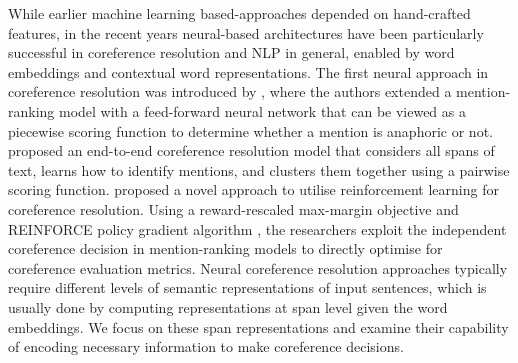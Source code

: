 \documentclass[11pt]{article}
\begin{document}
While earlier machine learning based-approaches depended on hand-crafted features, in the recent years neural-based architectures have been particularly successful in coreference resolution and NLP in general, enabled by word embeddings and contextual word representations. The first neural approach in coreference resolution was introduced by \textcite{wiseman2015learning}, where the authors extended a mention-ranking model with a feed-forward neural network that can be viewed as a piecewise scoring function to determine whether a mention is anaphoric or not. \textcite{lee2017end} proposed an end-to-end coreference resolution model that considers all spans of text, learns how to identify mentions, and clusters them together using a pairwise scoring function. \textcite{clark2016deep} proposed a novel approach to utilise reinforcement learning for coreference resolution. Using a reward-rescaled max-margin objective and REINFORCE policy gradient algorithm \parencite{reinforce}, the researchers exploit the independent coreference decision in mention-ranking models to directly optimise for coreference evaluation metrics. Neural coreference resolution approaches typically require different levels of semantic representations of input sentences, which is usually done by computing representations at span level given the word embeddings. We focus on these span representations and examine their capability of encoding necessary information to make coreference decisions. 




\end{document}
